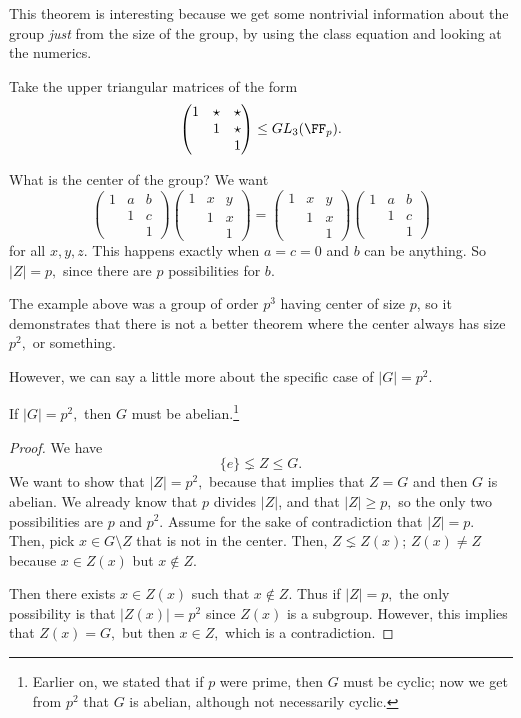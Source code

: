 This theorem is interesting because we get some nontrivial information about the group \emph{just} from the size of the group, by using the class equation and looking at the numerics.

\begin{example}
Take the upper triangular matrices of the form \[\begin{pmatrix}
1 & \star & \star \\
 & 1 & \star \\
 & & 1
\end{pmatrix} \leq GL_3(\FF_p).\]

What is the center of the group? We want \[\begin{pmatrix}
1 & a & b \\
 & 1 & c \\
 & & 1
\end{pmatrix}
\begin{pmatrix} 1 & x & y \\
 & 1 & x \\
 & & 1
\end{pmatrix} = \begin{pmatrix}1 & x & y \\
 & 1 & x \\
 & & 1
\end{pmatrix}\begin{pmatrix}1 & a & b \\
 & 1 & c \\
 & & 1
\end{pmatrix}\] for all $x, y, z.$
This happens exactly when $a = c = 0$ and $b$ can be anything. So $|Z| = p,$ since there are $p$ possibilities for $b.$

\end{example}

The example above was a group of order $p^3$ having center of size $p$, so it demonstrates that there is not a better theorem where the center always has size $p^2,$ or something. 

However, we can say a little more about the specific case of $|G| = p^2$.
\begin{corollary}
If $|G| = p^2,$ then $G$ must be abelian.\footnote{Earlier on, we stated that if $p$ were prime, then $G$ must be cyclic; now we get from $p^2$ that $G$ is abelian, although not necessarily cyclic.} 
\end{corollary}

\begin{proof}
We have 
\[
\{e\} \lneq Z \leq G.
\]
We want to show that $|Z| = p^2,$ because that implies that $Z = G$ and then $G$ is abelian. We already know that $p$ divides $|Z|$, and that $|Z| \geq p,$ so the only two possibilities are $p$ and $p^2.$ Assume for the sake of contradiction that $|Z| = p.$ Then, pick $x \in G \setminus Z$ that is not in the center. Then, $Z \lneq Z(x)$; $Z(x) \neq Z$ because $x \in Z(x)$ but $x \not \in Z$. 

Then there exists $x \in Z(x)$ such that $x \notin Z.$ Thus if $|Z| = p,$ the only possibility is that $|Z(x)| = p^2$ since $Z(x)$ is a subgroup.
However, this implies that $Z(x) = G,$ but then $x \in Z,$ which is a contradiction. 
\end{proof}

